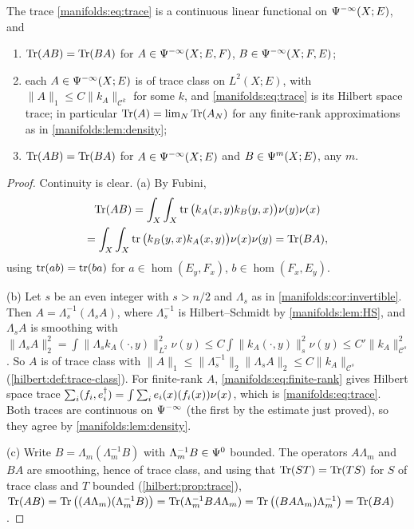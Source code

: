 \begin{proposition}\label{manifolds:prop:trace}
The trace \eqref{manifolds:eq:trace} is a continuous linear functional on
$\Psi^{-\infty}(X;E)$, and
\begin{enumerate}[label=\textup{(\alph*)}]
\item $\operatorname{Tr}(AB)=\operatorname{Tr}(BA)$ for $A\in\Psi^{-\infty}(X;E,F)$, $B\in\Psi^{-\infty}(X;F,E)$;
\item each $A\in\Psi^{-\infty}(X;E)$ is of trace class on $L^2(X;E)$, with
$\|A\|_1\le C\|k_A\|_{\mathcal C^k}$ for some $k$, and \eqref{manifolds:eq:trace} is its
Hilbert space trace; in particular $\operatorname{Tr}(A)=\lim_N\operatorname{Tr}(A_N)$ for any finite-rank
approximations as in \cref{manifolds:lem:density};
\item $\operatorname{Tr}(AB)=\operatorname{Tr}(BA)$ for $A\in\Psi^{-\infty}(X;E)$ and $B\in\Psi^{m}(X;E)$, any $m$.
\end{enumerate}
\end{proposition}
\begin{proof}
Continuity is clear. (a) By Fubini,
\begin{multline*}
\operatorname{Tr}(AB)=\int_X\int_X\operatorname{tr}\big(k_A(x,y)k_B(y,x)\big)\nu(y)\nu(x)
\\=\int_X\int_X\operatorname{tr}\big(k_B(y,x)k_A(x,y)\big)\nu(x)\nu(y)=\operatorname{Tr}(BA),
\end{multline*}
using $\operatorname{tr}(ab)=\operatorname{tr}(ba)$ for $a\in\hom(E_y,F_x)$, $b\in\hom(F_x,E_y)$.

(b) Let $s$ be an even integer with $s>n/2$ and $\Lambda_s$ as in
\cref{manifolds:cor:invertible}. Then $A=\Lambda_s^{-1}(\Lambda_sA)$, where $\Lambda_s^{-1}$ is
Hilbert--Schmidt by \cref{manifolds:lem:HS}, and $\Lambda_sA$ is smoothing with
$\|\Lambda_sA\|_2^2=\int\|\Lambda_sk_A(\cdot,y)\|_{L^2}^2\nu(y)\le C\int\|k_A(\cdot,y)\|^2_{s}\nu(y)\le C'\|k_A\|^2_{\mathcal C^s}$.
So $A$ is of trace class with $\|A\|_1\le\|\Lambda_s^{-1}\|_2\|\Lambda_sA\|_2\le C\|k_A\|_{\mathcal C^s}$
(\cref{hilbert:def:trace-class}). For finite-rank $A$, \eqref{manifolds:eq:finite-rank} gives
Hilbert space trace $\sum_i( f_i, e_i^\dagger)=\int\sum_i e_i(x)(f_i(x))\nu(x)$, which is
\eqref{manifolds:eq:trace}. Both traces are continuous on $\Psi^{-\infty}$ (the first by
the estimate just proved), so they agree by \cref{manifolds:lem:density}.

(c) Write $B=\Lambda_m(\Lambda_m^{-1}B)$ with $\Lambda_m^{-1}B\in\Psi^{0}$ bounded. The operators
$A\Lambda_m$ and $BA$ are smoothing, hence of trace class, and using that
$\operatorname{Tr}(ST)=\operatorname{Tr}(TS)$ for $S$ of trace class and $T$ bounded (\cref{hilbert:prop:trace}),
$\operatorname{Tr}(AB)=\operatorname{Tr}\big((A\Lambda_m)(\Lambda_m^{-1}B)\big)=\operatorname{Tr}(\Lambda_m^{-1}BA\Lambda_m)
=\operatorname{Tr}\big((BA\Lambda_m)\Lambda_m^{-1}\big)=\operatorname{Tr}(BA)$.
\end{proof}

